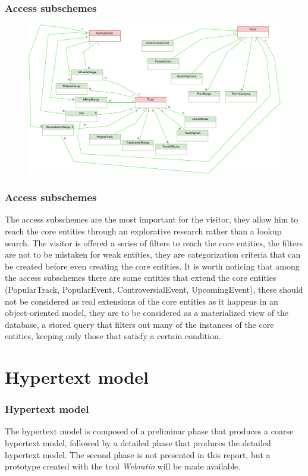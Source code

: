 \documentclass{beamer}
\begin{document}
\begin{frame}
    \frametitle{Access subschemes}
    \begin{figure}
        \centering
        \includegraphics[width=1\linewidth]{drawio/access-subschemes-cropped.pdf}
    \end{figure}
\end{frame}

\begin{frame}
    \frametitle{Access subschemes}
    \scriptsize
    The access subschemes are the most important for the visitor, they allow him to reach the core entities
    through an explorative research rather than a lookup search. The visitor is offered a series of filters to reach the core entities,
    the filters are not to be mistaken for weak entities, they are categorization criteria that can be created before even creating
    the core entities. It is worth noticing that among the access subschemes there are some entities that extend the core entities
    (PopularTrack, PopularEvent, ControversialEvent, UpcomingEvent), these should not be considered as real extensions of the core entities 
    as it happens in an object-oriented model, they are to be considered as a materialized view of the database, a stored query that filters out
    many of the instances of the core entities, keeping only those that satisfy a certain condition.
\end{frame}

\section{Hypertext model}

\begin{frame}
    \frametitle{Hypertext model}
    The hypertext model is composed of a preliminar phase that produces a coarse hypertext model,
    followed by a detailed phase that produces the detailed hypertext model.
    The second phase is not presented in this report, but a prototype created with the tool \textit{Webratio} will be made available.
\end{frame}
\end{document}
